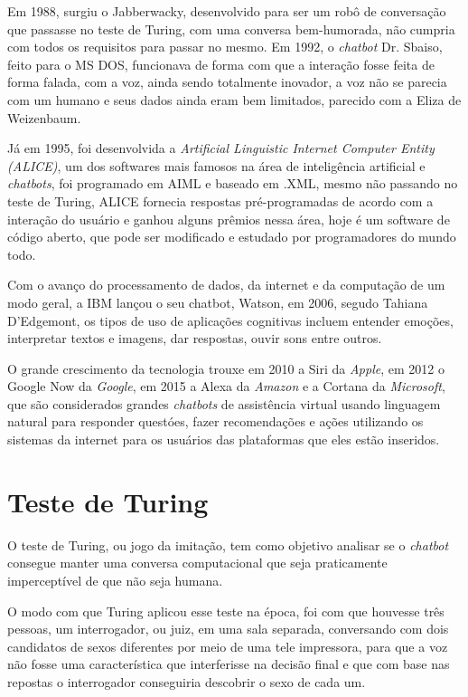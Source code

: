 \documentclass[
	12pt,				%
	oneside,
	a4paper,			%
	english,			%
	french,				%
	spanish,			%
	brazil				%
	]{abntex2}
\begin{document}
Em 1988, surgiu o Jabberwacky, desenvolvido para ser um robô de conversação que passasse no teste de Turing, com uma conversa bem-humorada, não cumpria com todos os requisitos para passar no mesmo. 
Em 1992, o \emph{chatbot} Dr. Sbaiso, feito para o MS DOS, funcionava de forma com que a interação fosse feita de forma falada, com a voz, ainda sendo totalmente inovador, a voz não se parecia com um humano e seus dados ainda eram bem limitados, parecido com a Eliza de Weizenbaum.

Já em 1995, foi desenvolvida a \emph{Artificial Linguistic Internet Computer Entity (ALICE)}, um dos softwares mais famosos na área de inteligência artificial e \emph{chatbots}, foi programado em AIML e baseado em .XML, mesmo não passando no teste de Turing, ALICE fornecia respostas pré-programadas de acordo com a interação do usuário e ganhou alguns prêmios nessa área, hoje é um software de código aberto, que pode ser modificado e estudado por programadores do mundo todo.

Com o avanço do processamento de dados, da internet e da computação de um modo geral, a IBM lançou o seu chatbot, Watson, em 2006, segudo Tahiana D'Edgemont, os tipos de uso de aplicações cognitivas incluem entender emoções, interpretar textos e imagens, dar respostas, ouvir sons entre outros.

O grande crescimento da tecnologia trouxe em 2010 a Siri da \emph{Apple}, em 2012 o Google Now da \emph{Google}, em 2015 a Alexa da \emph{Amazon} e a Cortana da \emph{Microsoft}, que são considerados grandes \emph{chatbots} de assistência virtual usando linguagem natural para responder questóes, fazer recomendações e ações utilizando os sistemas da internet para os usuários das plataformas que eles estão inseridos.


\section{Teste de Turing}
O teste de Turing, ou jogo da imitação, tem como objetivo analisar se o \emph{chatbot} consegue manter uma conversa computacional que seja praticamente imperceptível de que não seja humana.

O modo com que Turing aplicou esse teste na época, foi com que houvesse três pessoas, um interrogador, ou juiz, em uma sala separada, conversando com dois candidatos de sexos diferentes por meio de uma tele impressora, para que a voz não fosse uma característica que interferisse na decisão final e que com base nas repostas o interrogador conseguiria descobrir o sexo de cada um.
\end{document}
